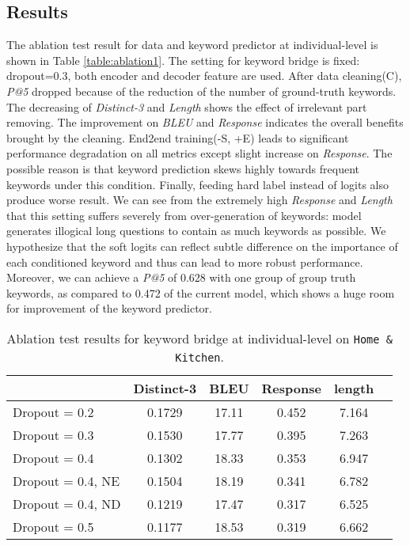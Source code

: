 \documentclass[11pt,a4paper]{article}
\begin{document}
\subsection{Results}

The ablation test result for data and keyword predictor at individual-level is shown in Table \ref{table:ablation1}. The setting for keyword bridge is fixed: dropout=0.3, both encoder and decoder feature are used. After data cleaning(C), \textit{P@5} dropped because of the reduction of the number of ground-truth keywords. The decreasing of \textit{Distinct-3} and \textit{Length} shows the effect of irrelevant part removing. The improvement on \textit{BLEU} and \textit{Response} indicates the overall benefits brought by the cleaning. End2end training(-S, +E) leads to significant performance degradation on all metrics except slight increase on \textit{Response}. The possible reason is that keyword prediction skews highly towards frequent keywords under this condition. Finally, feeding hard label instead of logits also produce worse result. We can see from the extremely high \textit{Response} and \textit{Length} that this setting suffers severely from over-generation of keywords: model generates illogical long questions to contain as much keywords as possible. We hypothesize that the soft logits can reflect subtle difference on the importance of each conditioned keyword and thus can lead to more robust performance. Moreover, we can achieve a \textit{P@5} of 0.628 with one group of group truth keywords, as compared to 0.472 of the current model, which shows a huge room for improvement of the keyword predictor.

\begin{table*}[htbp]
  \centering
  \begin{tabular}{l|ccccc}
  \hline
  {} & Distinct-3 & BLEU & Response & length \\
  \hline
  Dropout = 0.2 & 0.1729 & 17.11 & 0.452 & 7.164 \\ 
  Dropout = 0.3 & 0.1530 & 17.77 & 0.395 & 7.263 \\
  Dropout = 0.4 & 0.1302 & 18.33 & 0.353 & 6.947 \\
  Dropout = 0.4, NE & 0.1504 & 18.19 & 0.341 & 6.782 \\
  Dropout = 0.4, ND & 0.1219 & 17.47 & 0.317 & 6.525 \\
  Dropout = 0.5 & 0.1177 & 18.53 & 0.319 & 6.662 \\
  \hline
  \end{tabular}
  \caption{\label{table:ablation2} Ablation test results for keyword bridge at individual-level on \texttt{Home \& Kitchen}.}
  \end{table*}
\end{document}
